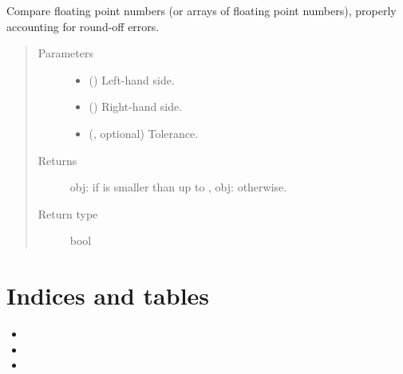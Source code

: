 \documentclass[letterpaper,10pt,english]{sphinxmanual}
\begin{document}
\begin{fulllineitems}
\label{\detokenize{api:utils.smaller_than}}
Compare floating point numbers (or arrays of floating point numbers),
properly accounting for round-off errors.
\begin{quote}\begin{description}
\item[{Parameters}] \leavevmode\begin{itemize}
\item {} 
 () \textendash{} Left-hand side.

\item {} 
 () \textendash{} Right-hand side.

\item {} 
 (, optional) \textendash{} Tolerance.

\end{itemize}

\item[{Returns}] \leavevmode
obj: if  is smaller than  up to , obj: otherwise.

\item[{Return type}] \leavevmode
bool

\end{description}\end{quote}

\end{fulllineitems}



\chapter{Indices and tables}
\label{\detokenize{index:indices-and-tables}}\begin{itemize}
\item {} 

\item {} 

\item {} 

\end{itemize}
\end{document}
